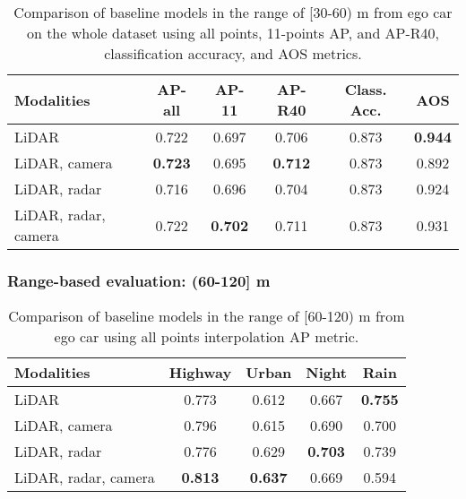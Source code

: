 \documentclass{article}
\begin{document}
\begin{table*}[!h]
  \small
  \centering
  \begin{tabular}{@{}l|ccccc@{}}
    \toprule
    Modalities          & AP-all    & AP-11     & AP-R40    & Class. Acc.   & AOS\\
    \midrule
    LiDAR               & 0.722     & 0.697     & 0.706     & 0.873         & \bf{0.944} \\
    LiDAR, camera       & \bf{0.723}& 0.695     & \bf{0.712}& 0.873         & 0.892 \\
    LiDAR, radar        & 0.716     & 0.696     & 0.704     & 0.873         & 0.924 \\
    LiDAR, radar, camera & 0.722    & \bf{0.702}& 0.711     & 0.873         & 0.931 \\
    \bottomrule
  \end{tabular}
  \caption{Comparison of baseline models in the range of [30-60) m from ego car on the whole dataset using all points, 11-points AP, and AP-R40, classification accuracy, and AOS metrics.}
  \label{tab:metrics8}
\end{table*}

\newpage
\subsubsection{Range-based evaluation: (60-120] m}
\begin{table*}[!h]
  \small
  \centering
  \begin{tabular}{@{}l|cccc@{}}
    \toprule
    Modalities          & Highway   & Urban     & Night     & Rain  \\
    \midrule
    LiDAR               & 0.773     & 0.612     & 0.667     & \bf{0.755} \\
    LiDAR, camera       & 0.796     & 0.615     & 0.690     & 0.700 \\
    LiDAR, radar        & 0.776     & 0.629     & \bf{0.703}& 0.739 \\
    LiDAR, radar, camera &\bf{0.813}&\bf{0.637} & 0.669     & 0.594 \\
    \bottomrule
  \end{tabular}
  \caption{Comparison of baseline models in the range of [60-120) m from ego car using all points interpolation AP metric.}
  \label{tab:metrics_60_120}
\end{table*}
\end{document}
